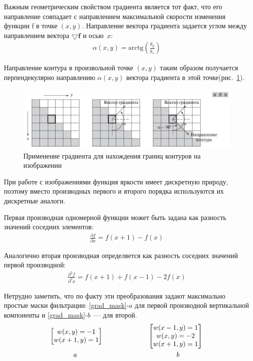 \documentclass[12pt,a4paper]{article} %
\begin{document}
Важным геометрическим свойством градиента является тот факт, что его направление совпадает с направлением максимальной скорости изменения функции f в точке $(x, y)$. Направление вектора градиента задается углом между направлением вектора $\bigtriangledown \mathbf{f}$ и осью~$x$:
\begin{gather}\label{grad_alpha}
	\alpha(x, y) = \text{arctg}\left(\frac{g_y}{g_x}\right)
\end{gather}

Направление контура в произвольной точке $(x,y)$ таким образом получается перпендекулярно направлению $\alpha(x,y)$ вектора градиента в этой точке(рис.~\ref{fig:grad}).


\begin{figure}[h]
	
	\centering
	
	\includegraphics[width=0.7\linewidth]{grad.jpg}
	
	\caption{Применение градиента для нахождения границ контуров на изображении}
	
	\label{fig:grad}
	
\end{figure}

\newpage

При работе с изображениями функция яркости имеет дискретную природу, поэтому вместо производных первого и второго порядка используются их дискретные аналоги.

Первая производная одномерной функции может быть задана как разность значений соседних элементов:
\begin{gather}\label{first}
	\frac{\partial f}{\partial x}=
	f(x+1) - f(x)
\end{gather}

Аналогично вторая производная определяется как разность соседних значений первой производной:
\begin{gather}\label{second}
	\frac{\partial^2 f}{\partial^2 x}=
	f(x+1) + f(x-1) -2f(x)
\end{gather}

Нетрудно заметить, что по факту эти преобразования задают максимально простые маски фильтрации:
\ref{grad_mask}-$a$ для первой производной вертикальной компоненты и \ref{grad_mask}-$b$~--- для второй.
\begin{gather}\label{grad_mask}
	\begin{bmatrix} w(x,y)=-1 \\ w(x+1,y)=1 \end{bmatrix}
	~~~~~~~~~~~~~~~~~~~~
	\begin{bmatrix} 
	w(x-1,y)=1 \\ w(x,y)=-2 \\ w(x+1,y)=1 \\
	\end{bmatrix}\\
a~~~~~~~~~~~~~~~~~~~~~~~~~~~~~~~~~~~~~~~~~~~~b\notag
\end{gather}
\end{document}

